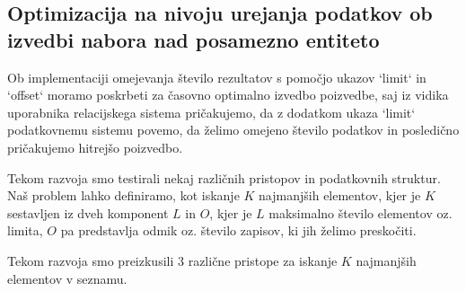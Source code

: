 \documentclass[a4paper,12pt,openright]{book}
\begin{document}
        \subsection{Optimizacija na nivoju urejanja podatkov ob izvedbi nabora nad posamezno entiteto}

        Ob implementaciji omejevanja število rezultatov s pomočjo ukazov `limit` in `offset` moramo poskrbeti za časovno optimalno izvedbo poizvedbe, saj iz vidika uporabnika relacijskega sistema pričakujemo, da z dodatkom ukaza `limit` podatkovnemu sistemu povemo, da želimo omejeno število podatkov in posledično pričakujemo hitrejšo poizvedbo.

        Tekom razvoja smo testirali nekaj različnih pristopov in podatkovnih struktur. Naš problem lahko definiramo, kot iskanje $K$ najmanjših elementov, kjer je $K$ sestavljen iz dveh komponent $L$ in $O$, kjer je $L$ maksimalno število elementov oz. limita, $O$ pa predstavlja odmik oz. število zapisov, ki jih želimo preskočiti.

        Tekom razvoja smo preizkusili 3 različne pristope za iskanje $K$ najmanjših elementov v seznamu.
\end{document}
